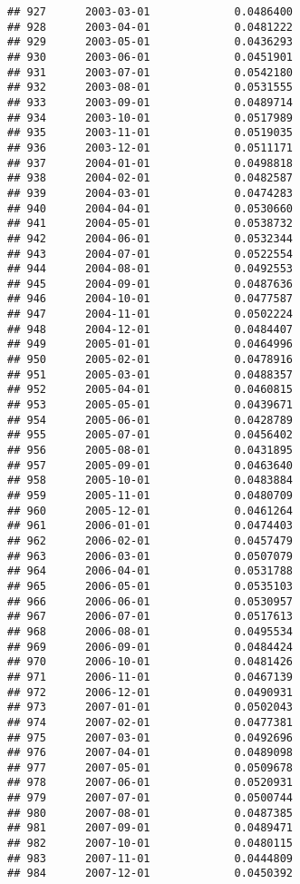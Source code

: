\documentclass[
]{article}
\begin{document}
\begin{verbatim}
## 927      2003-03-01             0.0486400
## 928      2003-04-01             0.0481222
## 929      2003-05-01             0.0436293
## 930      2003-06-01             0.0451901
## 931      2003-07-01             0.0542180
## 932      2003-08-01             0.0531555
## 933      2003-09-01             0.0489714
## 934      2003-10-01             0.0517989
## 935      2003-11-01             0.0519035
## 936      2003-12-01             0.0511171
## 937      2004-01-01             0.0498818
## 938      2004-02-01             0.0482587
## 939      2004-03-01             0.0474283
## 940      2004-04-01             0.0530660
## 941      2004-05-01             0.0538732
## 942      2004-06-01             0.0532344
## 943      2004-07-01             0.0522554
## 944      2004-08-01             0.0492553
## 945      2004-09-01             0.0487636
## 946      2004-10-01             0.0477587
## 947      2004-11-01             0.0502224
## 948      2004-12-01             0.0484407
## 949      2005-01-01             0.0464996
## 950      2005-02-01             0.0478916
## 951      2005-03-01             0.0488357
## 952      2005-04-01             0.0460815
## 953      2005-05-01             0.0439671
## 954      2005-06-01             0.0428789
## 955      2005-07-01             0.0456402
## 956      2005-08-01             0.0431895
## 957      2005-09-01             0.0463640
## 958      2005-10-01             0.0483884
## 959      2005-11-01             0.0480709
## 960      2005-12-01             0.0461264
## 961      2006-01-01             0.0474403
## 962      2006-02-01             0.0457479
## 963      2006-03-01             0.0507079
## 964      2006-04-01             0.0531788
## 965      2006-05-01             0.0535103
## 966      2006-06-01             0.0530957
## 967      2006-07-01             0.0517613
## 968      2006-08-01             0.0495534
## 969      2006-09-01             0.0484424
## 970      2006-10-01             0.0481426
## 971      2006-11-01             0.0467139
## 972      2006-12-01             0.0490931
## 973      2007-01-01             0.0502043
## 974      2007-02-01             0.0477381
## 975      2007-03-01             0.0492696
## 976      2007-04-01             0.0489098
## 977      2007-05-01             0.0509678
## 978      2007-06-01             0.0520931
## 979      2007-07-01             0.0500744
## 980      2007-08-01             0.0487385
## 981      2007-09-01             0.0489471
## 982      2007-10-01             0.0480115
## 983      2007-11-01             0.0444809
## 984      2007-12-01             0.0450392

\end{verbatim}
\end{document}
